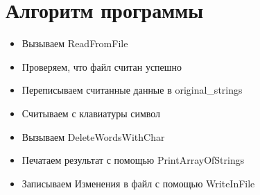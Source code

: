 \section*{Алгоритм программы}

\begin{itemize}
    \item Вызываем ReadFromFile
    \item Проверяем, что файл считан успешно
    \item Переписываем считанные данные в original\_strings
    \item Считываем с клавиатуры символ
    \item Вызываем DeleteWordsWithChar
    \item Печатаем результат с помощью PrintArrayOfStrings
    \item Записываем Изменения в файл с помощью WriteInFile
\end{itemize}
